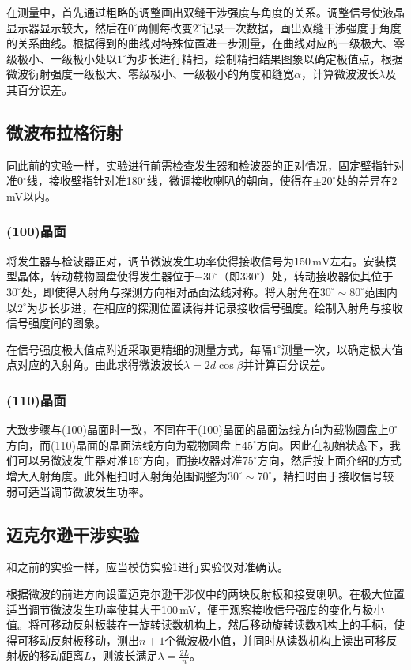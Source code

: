 \documentclass[12pt]{article}
\begin{document}
在测量中，首先通过粗略的调整画出双缝干涉强度与角度的关系。调整信号使液晶显示器显示较大，然后在$0^\circ$两侧每改变$2^\circ$记录一次数据，画出双缝干涉强度于角度的关系曲线。根据得到的曲线对特殊位置进一步测量，在曲线对应的一级极大、零级极小、一级极小处以$ 1^\circ $为步长进行精扫，绘制精扫结果图象以确定极值点，根据微波衍射强度一级极大、零级极小、一级极小的角度和缝宽$\alpha$，计算微波波长$\lambda$及其百分误差。

\subsection{微波布拉格衍射}
同此前的实验一样，实验进行前需检查发生器和检波器的正对情况，固定壁指针对准0$^\circ$线，接收壁指针对准180$^\circ$线，微调接收喇叭的朝向，使得在$ \pm20^\circ $处的差异在2\,mV以内。
\subsubsection{(100)晶面}
将发生器与检波器正对，调节微波发生功率使得接收信号为$ 150\,\mathrm{mV} $左右。安装模型晶体，转动载物圆盘使得发生器位于$ -30^\circ $（即$ 330^\circ $）处，转动接收器使其位于$ 30^\circ $处，即使得入射角与探测方向相对晶面法线对称。将入射角在$ 30^\circ\sim80^\circ $范围内以$ 2^\circ $为步长步进，在相应的探测位置读得并记录接收信号强度。绘制入射角与接收信号强度间的图象。

在信号强度极大值点附近采取更精细的测量方式，每隔$ 1^\circ $测量一次，以确定极大值点对应的入射角。由此求得微波波长$ \lambda=2d\cos\beta $并计算百分误差。

\subsubsection{(110)晶面}
大致步骤与(100)晶面时一致，不同在于(100)晶面的晶面法线方向为载物圆盘上$ 0^\circ $方向，而(110)晶面的晶面法线方向为载物圆盘上$ 45^\circ $方向。因此在初始状态下，我们可以另微波发生器对准$ 15^\circ $方向，而接收器对准$ 75^\circ $方向，然后按上面介绍的方式增大入射角度。此外粗扫时入射角范围调整为$ 30^\circ\sim70^\circ $，精扫时由于接收信号较弱可适当调节微波发生功率。

\subsection{迈克尔逊干涉实验}
和之前的实验一样，应当模仿实验1进行实验仪对准确认。

根据微波的前进方向设置迈克尔逊干涉仪中的两块反射板和接受喇叭。在极大位置适当调节微波发生功率使其大于100\,mV，便于观察接收信号强度的变化与极小值。将可移动反射板装在一旋转读数机构上，然后移动旋转读数机构上的手柄，使得可移动反射板移动，测出$ n+1 $个微波极小值，并同时从读数机构上读出可移反射板的移动距离$ L $，则波长满足$ \lambda=\frac{2L}{n} $。
\end{document}
